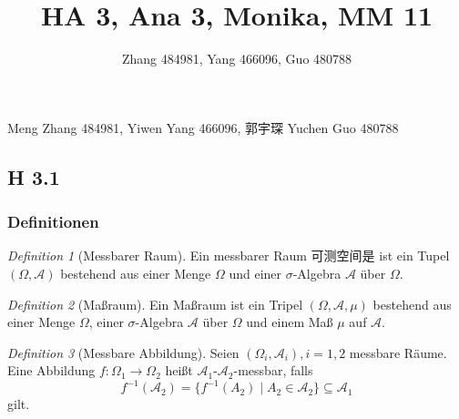 \documentclass[draft,a5paper]{article}
\title{HA 3, Ana 3, Monika, MM 11}
\author{Zhang 484981, Yang 466096, Guo 480788}
\theoremstyle{remark}
\newtheorem*{Definition}{Definition}
\begin{document}
\maketitle
\begin{center}
  Meng Zhang 484981, Yiwen Yang 466096, 郭宇琛 Yuchen Guo 480788
\end{center}
\subsection{H 3.1}
\subsubsection{Definitionen}
\begin{Definition}[Messbarer Raum]
  Ein messbarer Raum 可测空间是 ist ein Tupel \((\Omega, \mathcal{A})\) bestehend aus einer
  Menge \(\Omega\) und einer \(\sigma\)-Algebra \(\mathcal{A}\) über \(\Omega\).
\end{Definition}
\begin{Definition}[Maßraum]
  Ein Maßraum ist ein Tripel \((\Omega, \mathcal{A}, \mu)\) bestehend aus einer
  Menge \(\Omega\), einer \(\sigma\)-Algebra \(\mathcal{A}\) über \(\Omega\) und einem Maß \(\mu\) auf \(\mathcal{A}\).
\end{Definition}
\begin{Definition}[Messbare Abbildung]
  Seien \((\Omega_{i}, \mathcal{A}_{i}), i = 1, 2\) messbare Räume.  Eine Abbildung
  \(f\colon \Omega_{1} \to \Omega_{2}\) heißt \(\mathcal{A}_{1}\)-\(\mathcal{A}_{2}\)-messbar, falls
  \[
    f^{-1}(\mathcal{A}_{2}) = \{f^{-1}(A_{2}) \mid A_{2} \in \mathcal{A}_{2}\} \subseteq \mathcal{A}_{1}
  \]
  gilt.
\end{Definition}
\end{document}

